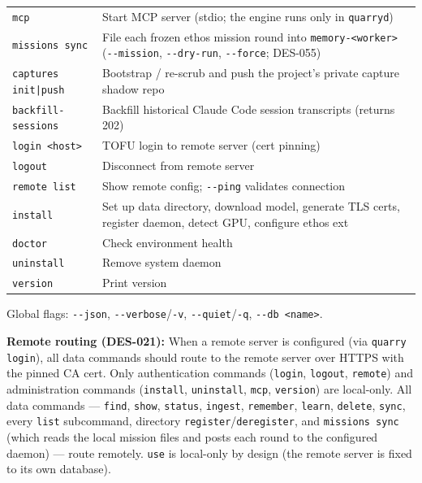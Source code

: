 \documentclass[a4paper,10pt]{article}
\begin{document}
\begin{center}
\begin{longtable}{lp{8cm}}
\texttt{mcp}                  & Start MCP server (stdio; the engine runs
  only in \texttt{quarryd}) \\
\texttt{missions sync}        & File each frozen ethos mission round into
  \texttt{memory-<worker>} (\texttt{-{}-mission}, \texttt{-{}-dry-run},
  \texttt{-{}-force}; DES-055) \\
\texttt{captures init|push}   & Bootstrap / re-scrub and push the project's
  private capture shadow repo \\
\texttt{backfill-sessions}    & Backfill historical Claude Code session
  transcripts (returns 202) \\
\texttt{login <host>}         & TOFU login to remote server (cert pinning) \\
\texttt{logout}              & Disconnect from remote server \\
\texttt{remote list}         & Show remote config; \texttt{-{}-ping} validates connection \\
\texttt{install}             & Set up data directory, download model, generate TLS certs,
  register daemon, detect GPU, configure ethos ext \\
\texttt{doctor}              & Check environment health \\
\texttt{uninstall}           & Remove system daemon \\
\texttt{version}             & Print version \\
\bottomrule
\end{longtable}
\end{center}

Global flags: \texttt{-{}-json}, \texttt{-{}-verbose}/\texttt{-v},
\texttt{-{}-quiet}/\texttt{-q}, \texttt{-{}-db <name>}.

\textbf{Remote routing (DES-021):} When a remote server is configured
(via \texttt{quarry login}), all data commands should route to the
remote server over HTTPS with the pinned CA cert.  Only authentication
commands (\texttt{login}, \texttt{logout}, \texttt{remote}) and
administration commands (\texttt{install}, \texttt{uninstall},
\texttt{mcp}, \texttt{version}) are local-only.
All data commands --- \texttt{find}, \texttt{show}, \texttt{status},
\texttt{ingest}, \texttt{remember}, \texttt{learn}, \texttt{delete},
\texttt{sync}, every \texttt{list} subcommand, directory
\texttt{register}/\texttt{deregister}, and \texttt{missions sync} (which
reads the local mission files and posts each round to the configured
daemon) --- route remotely.  \texttt{use}
is local-only by design (the remote server is fixed to its own
database).
\end{document}
